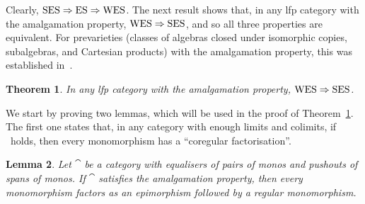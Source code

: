 \documentclass[a4paper,10pt,reqno]{amsart}
\newtheorem{theorem}{Theorem}[section]
\newtheorem{lemma}[theorem]{Lemma}
\theoremstyle{definition}
\theoremstyle{remark}
\begin{document}
Clearly, $\textnormal{SES}\Rightarrow\textnormal{ES}\Rightarrow\textnormal{WES}$. The next result shows that, in any lfp category with the amalgamation property, ${\textnormal{WES}\Rightarrow\textnormal{SES}}$, and so all three properties are equivalent.
%
 For prevarieties (classes of algebras closed under isomorphic copies, subalgebras, and Cartesian products) with the amalgamation property, this was established in~\cite[Theorem~1.3]{BMR2017}. 

\begin{theorem}\label{t:WES-to-SES}
In any lfp category with the amalgamation property, ${\textnormal{WES}\Rightarrow\textnormal{SES}}$.
\end{theorem}


We start by proving two lemmas, which will be used in the proof of Theorem~\ref{t:WES-to-SES}. The first one states that, in any category with enough limits and colimits, if \AP~holds, then every monomorphism has a ``coregular factorisation''.

\begin{lemma}\label{l:epi-reg-mono-for-monos}
	Let $\cat$ be a category with equalisers of pairs of monos and pushouts of spans of monos. If $\cat$ satisfies the amalgamation property, then every monomorphism factors as an epimorphism followed by a regular monomorphism.
	\end{lemma}
	
\end{document}
